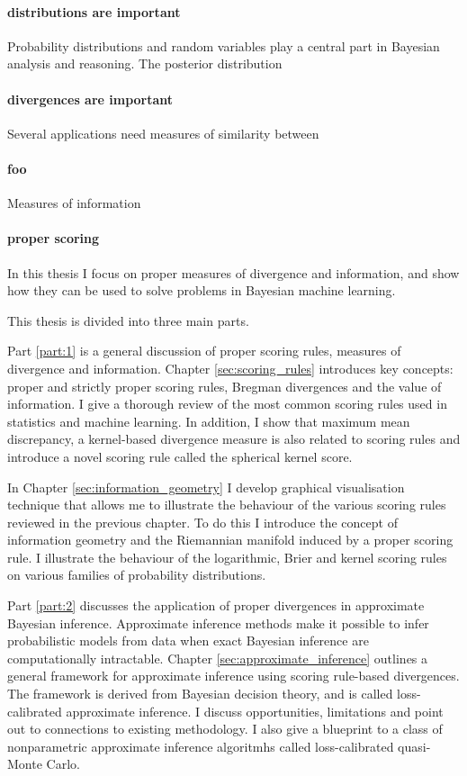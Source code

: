 
\paragraph{distributions are important}Probability distributions and random variables play a central part in Bayesian analysis and reasoning. The posterior distribution 

\paragraph{divergences are important}Several applications need measures of similarity between

\paragraph{foo}Measures of information

\paragraph{proper scoring} In this thesis I focus on proper measures of divergence and information, and show how they can be used to solve problems in Bayesian machine learning.

This thesis is divided into three main parts.

Part \ref{part:1} is a general discussion of proper scoring rules, measures of divergence and information. Chapter \ref{sec:scoring_rules} introduces key concepts: proper and strictly proper scoring rules, Bregman divergences and the value of information. I give a thorough review of the most common scoring rules used in statistics and machine learning. In addition, I show that maximum mean discrepancy, a kernel-based divergence measure is also related to scoring rules and introduce a novel scoring rule called the spherical kernel score.

In Chapter \ref{sec:information_geometry} I develop graphical visualisation technique that allows me to illustrate the behaviour of the various scoring rules reviewed in the previous chapter. To do this I introduce the concept of information geometry and the Riemannian manifold induced by a proper scoring rule. I illustrate the behaviour of the logarithmic, Brier and kernel scoring rules on various families of probability distributions.

Part \ref{part:2} discusses the application of proper divergences in approximate Bayesian inference. Approximate inference methods make it possible to infer probabilistic models from data when exact Bayesian inference are computationally intractable. Chapter \ref{sec:approximate_inference} outlines a general framework for approximate inference using scoring rule-based divergences. The framework is derived from Bayesian decision theory, and is called loss-calibrated approximate inference. I discuss opportunities, limitations and point out to connections to existing methodology. I also give a blueprint to a class of nonparametric approximate inference algoritmhs called loss-calibrated quasi-Monte Carlo.

